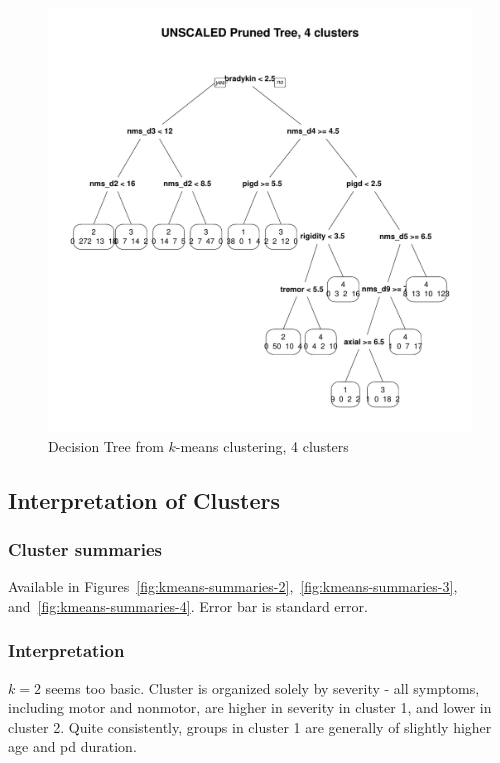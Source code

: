 \documentclass[letterpaper,12pt]{article}
\begin{document}
\begin{figure}[h]
  \centering
  \includegraphics[width=\linewidth]{dtree-kmeans-pruned-unscaled-4.pdf}
  \caption{Decision Tree from $k$-means clustering, 4 clusters}
  \label{fig:kmeans-dtree-4}
\end{figure}

\subsection{Interpretation of Clusters}

\subsubsection{Cluster summaries}

Available in
Figures~\ref{fig:kmeans-summaries-2},~\ref{fig:kmeans-summaries-3},
and~\ref{fig:kmeans-summaries-4}. Error bar is standard error.

\subsubsection{Interpretation}

$k = 2$ seems too basic. Cluster is organized solely by severity - all
symptoms, including motor and nonmotor, are higher in severity in cluster 1,
and lower in cluster 2. Quite consistently, groups in cluster 1 are generally
of slightly higher age and pd duration.
\end{document}

